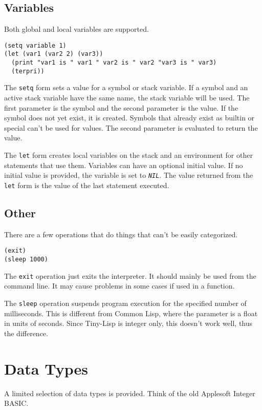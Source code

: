 \documentclass[10pt, openany]{book}
\newcommand{\function}[1]{\texttt{#1}}
\newcommand{\constant}[1]{\emph{\texttt{#1}}}
\newcommand{\tl}{Tiny-Lisp}
\newcommand{\cl}{Common Lisp}
\begin{document}
\subsection{Variables}
Both global and local variables are supported.
\begin{lstlisting}
(setq variable 1)
(let (var1 (var2 2) (var3))
  (print "var1 is " var1 " var2 is " var2 "var3 is " var3)
  (terpri))
\end{lstlisting}

The \function{setq} form sets a value for a symbol or stack variable.  If a symbol and an active stack variable have the same name, the stack variable will be used.  The first parameter is the symbol and the second parameter is the value.  If the symbol does not yet exist, it is created.  Symbols that already exist as builtin or special can't be used for values.  The second parameter is evaluated to return the value.

The \function{let} form creates local variables on the stack and an environment for other statements that use them.  Variables can have an optional initial value.  If no initial value is provided, the variable is set to \constant{NIL}.  The value returned from the \function{let} form is the value of the last statement executed.

\subsection{Other}
There are a few operations that do things that can't be easily categorized.

\begin{lstlisting}
(exit)
(sleep 1000)
\end{lstlisting}

The \function{exit} operation just exits the interpreter.  It should mainly be used from the command line.  It may cause problems in some cases if used in a function.

The \function{sleep} operation suspends program execution for the specified number of milliseconds.  This is different from \cl, where the parameter is a float in units of seconds.  Since \tl{} is integer only, this doesn't work well, thus the difference.

\section{Data Types}
A limited selection of data types is provided.  Think of the old Applesoft Integer BASIC.
\end{document}
